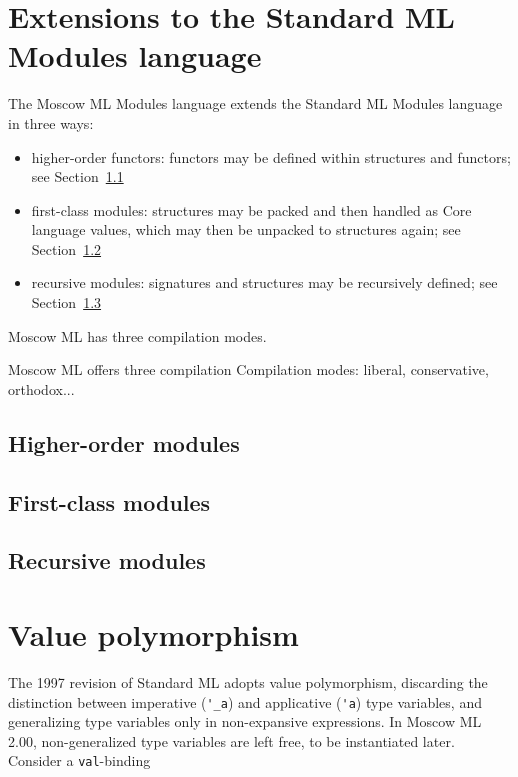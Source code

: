 \documentclass[fleqn]{article}
\begin{document}
\newpage
\section{Extensions to the Standard ML Modules language}
\label{sec-modules-extensions}

The Moscow ML Modules language extends the Standard ML Modules
language in three ways:

\begin{itemize}
\item higher-order functors: functors may be defined within
  structures and functors; see Section~\ref{sec-ho-modules}
\item first-class modules: structures may be packed and then handled
  as Core language values, which may then be unpacked to structures
  again; see Section~\ref{sec-firstclass-modules}
\item recursive modules: signatures and structures may be
  recursively defined; see Section~\ref{sec-rec-modules}
\end{itemize}

\noindent Moscow ML has three compilation modes.

Moscow ML offers three compilation 
Compilation modes: liberal, conservative, orthodox...


\subsection{Higher-order modules}
\label{sec-ho-modules}

\subsection{First-class modules}
\label{sec-firstclass-modules}

\subsection{Recursive modules}
\label{sec-rec-modules}


\newpage

\section{Value polymorphism}
\label{sec-valuepoly}

The 1997 revision of Standard ML \cite{Milner:1997:TheDefinition}
adopts value polymorphism, discarding the distinction between
imperative (\verb#'_a#) and applicative (\verb#'a#) type variables,
and generalizing type variables only in non-expansive expressions.  In
Moscow ML 2.00, non-generalized type variables are left free, to be
instantiated later.  Consider a {\tt val}-binding
\end{document}
